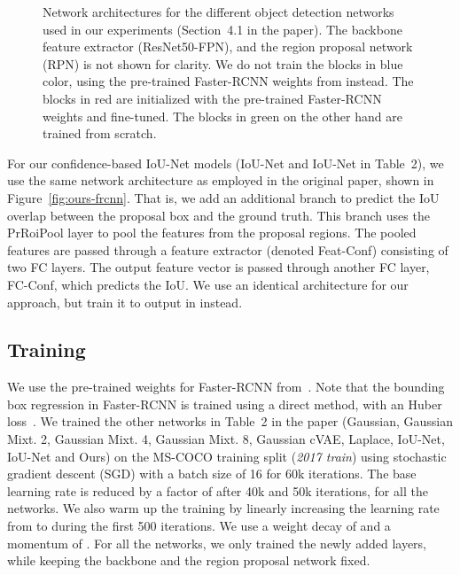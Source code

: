 \documentclass[runningheads]{llncs}
\begin{document}
\begin{appendices}
\begin{figure*}[t]
	\centering
	\caption{Network architectures for the different object detection networks used in our experiments (Section~4.1 in the paper). The backbone feature extractor (ResNet50-FPN), and the region proposal network (RPN) is not shown for clarity. We do not train the blocks in blue color, using the pre-trained Faster-RCNN weights from \cite{massa2018mrcnn} instead. The blocks in red are initialized with the pre-trained Faster-RCNN weights and fine-tuned. The blocks in green on the other hand are trained from scratch.}
	\label{fig:detectionarch}
\end{figure*}

For our confidence-based IoU-Net \cite{jiang2018acquisition} models (IoU-Net and IoU-Net in Table~2), we use the same network architecture as employed in the original paper, shown in Figure~\ref{fig:ours-frcnn}. That is, we add an additional branch to predict the IoU overlap between the proposal box and the ground truth. This branch uses the PrRoiPool \cite{jiang2018acquisition} layer to pool the features from the proposal regions. The pooled features are passed through a feature extractor (denoted Feat-Conf) consisting of two FC layers. The output feature vector is passed through another FC layer, FC-Conf, which predicts the IoU. We use an identical architecture for our approach, but train it to output  in  instead.





\subsection{Training}
We use the pre-trained weights for Faster-RCNN from~\cite{massa2018mrcnn}. Note that the bounding box regression in Faster-RCNN is trained using a direct method, with an Huber loss~\cite{huber1964robust}. We trained the other networks in Table~2 in the paper (Gaussian, Gaussian Mixt. 2, Gaussian Mixt. 4, Gaussian Mixt. 8, Gaussian cVAE, Laplace, IoU-Net, IoU-Net and Ours) on the MS-COCO \cite{lin2014microsoft} training split (\emph{2017 train}) using stochastic gradient descent (SGD) with a batch size of 16 for 60k iterations. The base learning rate  is reduced by a factor of  after 40k and 50k iterations, for all the networks. We also warm up the training by linearly increasing the learning rate from  to  during the first 500 iterations. We use a weight decay of  and a momentum of . For all the networks, we only trained the newly added layers, while keeping the backbone and the region proposal network fixed. 


\end{appendices}
\end{document}
